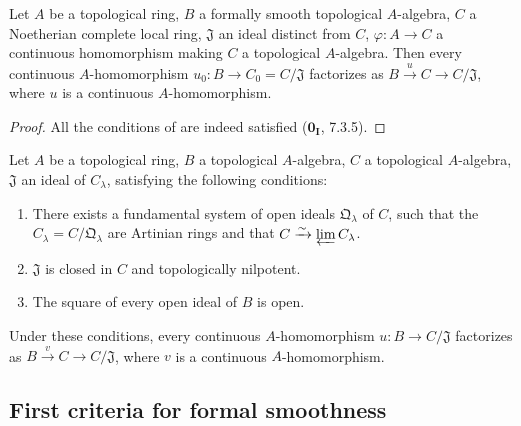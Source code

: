 \begin{corollary}[19.3.11]
\label{0.19.3.11}
Let $A$ be a topological ring, $B$ a formally smooth topological $A$-algebra, $C$ a Noetherian complete local ring, $\mathfrak{J}$ an ideal distinct from $C$, $\varphi:A\to C$ a continuous homomorphism making $C$ a topological $A$-algebra.
Then every continuous $A$-homomorphism $u_0:B\to C_0=C/\mathfrak{J}$ factorizes as $B\xrightarrow{u}C\to C/\mathfrak{J}$, where $u$ is a continuous $A$-homomorphism.
\end{corollary}

\begin{proof}
All the conditions of  are indeed satisfied ($\mathbf{0_I}$, 7.3.5).
\end{proof}

\begin{proposition}[19.3.12]
\label{0.19.3.12}
Let $A$ be a topological ring, $B$ a topological $A$-algebra, $C$ a topological $A$-algebra, $\mathfrak{J}$ an ideal of $C_\lambda$, satisfying the following conditions:
\begin{enumerate}
  \item[$1^\circ$] There exists a fundamental system of open ideals $\mathfrak{Q}_\lambda$ of $C$, such that the $C_\lambda=C/\mathfrak{Q}_\lambda$ are Artinian rings and that $C\xrightarrow{\sim}\varprojlim C_\lambda$.
  \item[$2^\circ$] $\mathfrak{J}$ is closed in $C$ and topologically nilpotent.
  \item[$3^\circ$] The square of every open ideal of $B$ is open.
\end{enumerate}
Under these conditions, every continuous $A$-homomorphism $u:B\to C/\mathfrak{J}$ factorizes as $B\xrightarrow{v}C\to C/\mathfrak{J}$, where $v$ is a continuous $A$-homomorphism.
\end{proposition}

\subsection{First criteria for formal smoothness}
\label{subsection:0.19.4}

